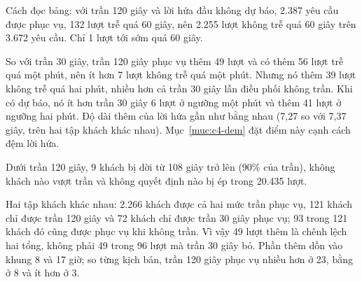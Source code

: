 Cách đọc bảng: với trần 120 giây và lời hứa đầu không dự báo, 2.387 yêu cầu được phục vụ, 132 lượt trễ quá 60 giây,
nên 2.255 lượt không trễ quá 60 giây trên 3.672 yêu cầu. Chỉ 1 lượt tới sớm quá 60 giây.

So với trần 30 giây, trần 120 giây phục vụ thêm 49 lượt và có thêm 56 lượt trễ quá một phút, nên ít hơn 7 lượt không
trễ quá một phút. Nhưng nó thêm 39 lượt không trễ quá hai phút, nhiều hơn cả trần 30 giây lẫn điều phối không trần.
Khi có dự báo, nó ít hơn trần 30 giây 6 lượt ở ngưỡng một phút và thêm 41 lượt ở ngưỡng hai phút. Độ dài thêm của lời
hứa gần như bằng nhau (7,27 so với 7,37 giây, trên hai tập khách khác nhau). Mục~\ref{muc:c4-dem} đặt điểm này cạnh
cách đệm lời hứa.

Dưới trần 120 giây, 9 khách bị dời từ 108 giây trở lên (90\% của trần), không khách nào vượt trần và không quyết định
nào bị ép trong 20.435 lượt.

Hai tập khách khác nhau: 2.266 khách được cả hai mức trần phục vụ, 121 khách chỉ được trần 120 giây và 72 khách chỉ
được trần 30 giây phục vụ; 93 trong 121 khách đó cũng được phục vụ khi không trần. Vì vậy 49 lượt thêm là chênh lệch
hai tổng, không phải 49 trong 96 lượt mà trần 30 giây bỏ. Phần thêm dồn vào khung 8 và 17 giờ; so từng kịch bản, trần
120 giây phục vụ nhiều hơn ở 23, bằng ở 8 và ít hơn ở 3.

